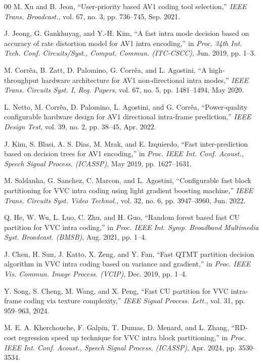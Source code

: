 \documentclass[conference]{IEEEtran}
\begin{document}
\begin{thebibliography}{00}
 M. Xu and B. Jeon, ``User-priority based AV1 coding tool selection,'' \emph{IEEE Trans. Broadcast.}, vol. 67, no. 3, pp. 736--745, Sep. 2021.

 J. Jeong, G. Gankhuyag, and Y.-H. Kim, ``A fast intra mode decision based on accuracy of rate distortion model for AV1 intra encoding,'' in \emph{Proc. 34th Int. Tech. Conf. Circuits/Syst., Comput. Commun. (ITC-CSCC)}, Jun. 2019, pp. 1--3.

 M. Corr\^ea, B. Zatt, D. Palomino, G. Corr\^ea, and L. Agostini, ``A high-throughput hardware architecture for AV1 non-directional intra modes,'' \emph{IEEE Trans. Circuits Syst. I, Reg. Papers}, vol. 67, no. 5, pp. 1481--1494, May 2020.

 L. Netto, M. Corr\^ea, D. Palomino, L. Agostini, and G. Corr\^ea, ``Power-quality configurable hardware design for AV1 directional intra-frame prediction,'' \emph{IEEE Design Test}, vol. 39, no. 2, pp. 38--45, Apr. 2022.

 J. Kim, S. Blasi, A. S. Dias, M. Mrak, and E. Izquierdo, ``Fast inter-prediction based on decision trees for AV1 encoding,'' in \emph{Proc. IEEE Int. Conf. Acoust., Speech Signal Process. (ICASSP)}, May 2019, pp. 1627--1631.

 M. Saldanha, G. Sanchez, C. Marcon, and L. Agostini, ``Configurable fast block partitioning for VVC intra coding using light gradient boosting machine,'' \emph{IEEE Trans. Circuits Syst. Video Technol.}, vol. 32, no. 6, pp. 3947--3960, Jun. 2022.

 Q. He, W. Wu, L. Luo, C. Zhu, and H. Guo, ``Random forest based fast CU partition for VVC intra coding,'' in \emph{Proc. IEEE Int. Symp. Broadband Multimedia Syst. Broadcast. (BMSB)}, Aug. 2021, pp. 1--4.

 J. Chen, H. Sun, J. Katto, X. Zeng, and Y. Fan, ``Fast QTMT partition decision algorithm in VVC intra coding based on variance and gradient,'' in \emph{Proc. IEEE Vis. Commun. Image Process. (VCIP)}, Dec. 2019, pp. 1--4.

 Y. Song, S. Cheng, M. Wang, and X. Peng, ``Fast CU partition for VVC intra-frame coding via texture complexity,'' \emph{IEEE Signal Process. Lett.}, vol. 31, pp. 959--963, 2024.

 M. E. A. Kherchouche, F. Galpin, T. Dumas, D. Menard, and L. Zhang, ``RD-cost regression speed up technique for VVC intra block partitioning,'' in \emph{Proc. IEEE Int. Conf. Acoust., Speech Signal Process. (ICASSP)}, Apr. 2024, pp. 3530--3534.


\end{thebibliography}
\end{document}
